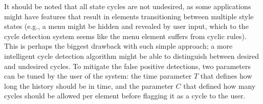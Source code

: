 \documentclass[a4paper,11pt]{kth-mag}
\begin{document}
        It should be noted that all state cycles are not undesired, as some applications might have features that result in elements transitioning between multiple style states (e.g., a menu might be hidden and revealed by user input, which to the cycle detection system seems like the menu element suffers from cyclic rules).
        This is perhaps the biggest drawback with such simple approach; a more intelligent cycle detection algorithm might be able to distinguish between desired and undesired cycles.
        To mitigate the false positive detections, two parameters can be tuned by the user of the system: the time parameter $T$ that defines how long the history should be in time, and the parameter $C$ that defined how many cycles should be allowed per element before flagging it as a cycle to the user.
        
\end{document}
